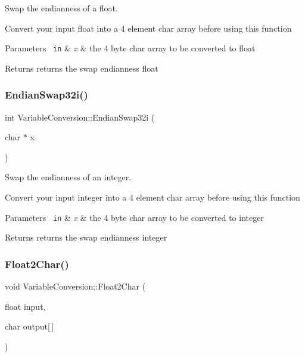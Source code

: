 Swap the endianness of a float. 

Convert your input float into a 4 element char array before using this function


\begin{DoxyParams}[1]{Parameters}
\mbox{\texttt{ in}}  & {\em x} & the 4 byte char array to be converted to float\\
\hline
\end{DoxyParams}
\begin{DoxyReturn}{Returns}
returns the swap endianness float 
\end{DoxyReturn}
\mbox{\label{class_variable_conversion_ae10304a5223aa1913aac928e5ecce8f9}} 
\subsubsection{\texorpdfstring{EndianSwap32i()}{EndianSwap32i()}}
{\footnotesize\ttfamily int Variable\+Conversion\+::\+Endian\+Swap32i (\begin{DoxyParamCaption}\item[{char $\ast$}]{x }\end{DoxyParamCaption})\hspace{0.3cm}{\ttfamily [inline]}}



Swap the endianness of an integer. 

Convert your input integer into a 4 element char array before using this function


\begin{DoxyParams}[1]{Parameters}
\mbox{\texttt{ in}}  & {\em x} & the 4 byte char array to be converted to integer\\
\hline
\end{DoxyParams}
\begin{DoxyReturn}{Returns}
returns the swap endianness integer 
\end{DoxyReturn}
\mbox{\label{class_variable_conversion_ab50543149570aba13c55c3488f155467}} 
\subsubsection{\texorpdfstring{Float2Char()}{Float2Char()}}
{\footnotesize\ttfamily void Variable\+Conversion\+::\+Float2\+Char (\begin{DoxyParamCaption}\item[{float}]{input,  }\item[{char}]{output\mbox{[}$\,$\mbox{]} }\end{DoxyParamCaption})\hspace{0.3cm}{\ttfamily [inline]}}



